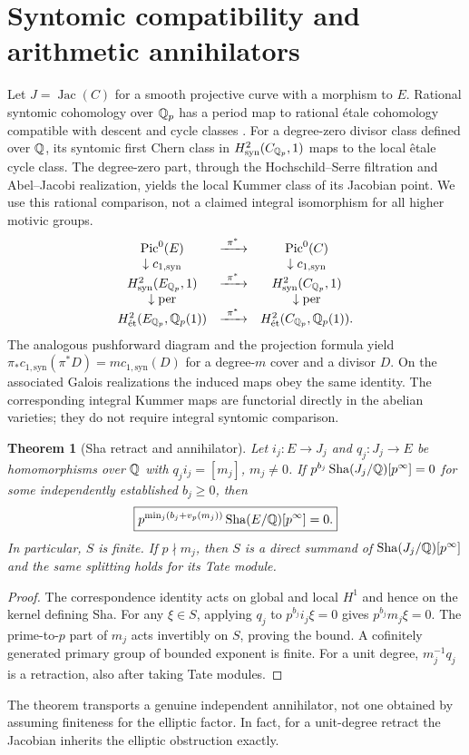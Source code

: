 \documentclass[11pt,a4paper]{article}
\newtheorem{theorem}{Theorem}[section]\newtheorem{proposition}[theorem]{Proposition}\newtheorem{corollary}[theorem]{Corollary}\theoremstyle{definition}\newtheorem{definition}[theorem]{Definition}\newtheorem{remark}[theorem]{Remark}
\renewcommand{\Sha}{\operatorname{Sha}}
\begin{document}
\section{Syntomic compatibility and arithmetic annihilators}
Let $J=\operatorname{Jac}(C)$ for a smooth projective curve with a morphism to $E$. Rational syntomic cohomology over $\mathbb Q_p$ has a period map to rational \'{e}tale cohomology compatible with descent and cycle classes \cite{nn,niziol}. For a degree-zero divisor class defined over $\mathbb Q$, its syntomic first Chern class in $H^2_{\mathrm{syn}}(C_{\mathbb Q_p},1)$ maps to the local \^{e}tale cycle class. The degree-zero part, through the Hochschild--Serre filtration and Abel--Jacobi realization, yields the local Kummer class of its Jacobian point. We use this rational comparison, not a claimed integral isomorphism for all higher motivic groups.
\begin{equation}\label{eq:diagram}
\begin{array}{ccc}
\operatorname{Pic}^0(E) &\xrightarrow{\ \pi^*\ }&\operatorname{Pic}^0(C)\\
\downarrow c_{1,\mathrm{syn}}&&\downarrow c_{1,\mathrm{syn}}\\
H^2_{\mathrm{syn}}(E_{\Qp},1)&\xrightarrow{\ \pi^*\ }&H^2_{\mathrm{syn}}(C_{\Qp},1)\\
\downarrow\mathrm{per}&&\downarrow\mathrm{per}\\
H^2_{\mathrm{\acute et}}(E_{\Qp},\Qp(1))&\xrightarrow{\ \pi^*\ }&H^2_{\mathrm{\acute et}}(C_{\Qp},\Qp(1)).
\end{array}
\end{equation}
The analogous pushforward diagram and the projection formula yield $\pi_*c_{1,\mathrm{syn}}(\pi^*D)=m c_{1,\mathrm{syn}}(D)$ for a degree-$m$ cover and a divisor $D$. On the associated Galois realizations the induced maps obey the same identity. The corresponding integral Kummer maps are functorial directly in the abelian varieties; they do not require integral syntomic comparison.

\begin{theorem}[Sha retract and annihilator]\label{thm:ann}
Let $i_j:E\to J_j$ and $q_j:J_j\to E$ be homomorphisms over $\mathbb Q$ with $q_ji_j=[m_j]$, $m_j\ne0$. If $p^{b_j}\Sha(J_j/\Q)[p^\infty]=0$ for some independently established $b_j\geq0$, then
\[
\boxed{p^{\min_j(b_j+v_p(m_j))}\Sha(E/\Q)[p^\infty]=0.}
\]
In particular, $S$ is finite. If $p\nmid m_j$, then $S$ is a direct summand of $\Sha(J_j/\Q)[p^\infty]$ and the same splitting holds for its Tate module.
\end{theorem}
\begin{proof}
The correspondence identity acts on global and local $H^1$ and hence on the kernel defining Sha. For any $\xi\in S$, applying $q_j$ to $p^{b_j}i_j\xi=0$ gives $p^{b_j}m_j\xi=0$. The prime-to-$p$ part of $m_j$ acts invertibly on $S$, proving the bound. A cofinitely generated primary group of bounded exponent is finite. For a unit degree, $m_j^{-1}q_j$ is a retraction, also after taking Tate modules.
\end{proof}
The theorem transports a genuine independent annihilator, not one obtained by assuming finiteness for the elliptic factor. In fact, for a unit-degree retract the Jacobian inherits the elliptic obstruction exactly.
\newpage
\end{document}
